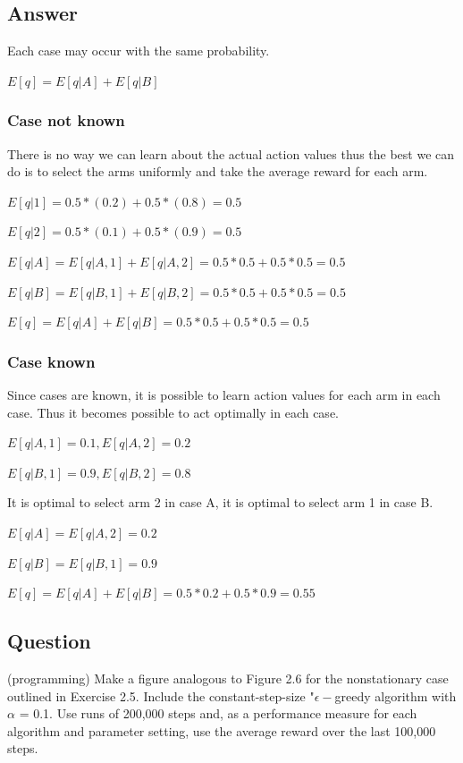 \documentclass{article}
\begin{document}
    \subsection*{Answer}

    Each case may occur with the same probability.

    $E[q]=E[q|A]+E[q|B]$

    \subsubsection*{Case not known}

    There is no way we can learn about the actual action values thus the best we can do is to select the arms uniformly and take the average reward for each arm.

    $E[q|1]=0.5*(0.2)+0.5*(0.8) = 0.5$

    $E[q|2]=0.5*(0.1)+0.5*(0.9) = 0.5$

    $E[q|A] = E[q|A,1] + E[q|A,2] = 0.5 * 0.5 + 0.5 * 0.5 = 0.5 $

    $E[q|B] = E[q|B,1] + E[q|B,2] = 0.5 * 0.5 + 0.5 * 0.5 = 0.5 $

    $E[q]=E[q|A]+E[q|B] = 0.5 * 0.5 + 0.5 * 0.5 = 0.5$

    \subsubsection*{Case known}

    Since cases are known, it is possible to learn action values for each arm in each case.
    Thus it becomes possible to act optimally in each case.

    $E[q|A, 1] = 0.1, E[q|A, 2] = 0.2$

    $E[q|B, 1] = 0.9, E[q|B, 2] = 0.8$

    It is optimal to select arm 2 in case A, it is optimal to select arm 1 in case B.

    $E[q|A] = E[q|A,2] = 0.2 $

    $E[q|B] = E[q|B,1] = 0.9 $

    $E[q]=E[q|A]+E[q|B] = 0.5 * 0.2 + 0.5 * 0.9 = 0.55$

    \subsection{Question}

    (programming) Make a figure analogous to Figure 2.6 for the nonstationary case outlined in Exercise 2.5. Include the constant-step-size "$\epsilon-$greedy algorithm with $\alpha$ = 0.1.
    Use runs of 200,000 steps and, as a performance measure for each algorithm and parameter setting, use the average reward over the last 100,000 steps.
\end{document}
